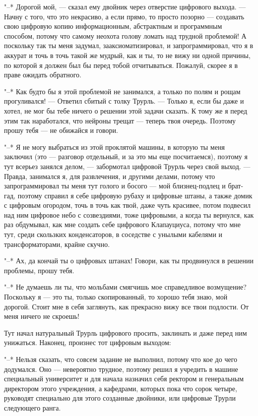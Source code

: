 "--* Дорогой мой, --- сказал ему двойник через отверстие
цифрового выхода. --- Начну с того, что это некрасиво, а если
прямо, то просто позорно --- создавать свою цифровую копию
информационным, абстрактным и программным способом, потому
что самому неохота голову ломать над трудной проблемой! А
поскольку так ты меня задумал, зааксиоматизировал, и
запрограммировал, что я в аккурат и точь в точь такой же
мудрый, как и ты, то не вижу ни одной причины, по которой я
должен был бы перед тобой отчитываться. Пожалуй, скорее я в
праве ожидать обратного.

"--* Как будто бы я этой проблемой не занимался, а только
по полям и рощам прогуливался! --- Ответил сбитый с толку
Трурль. --- Только я, если бы даже и хотел, не мог бы тебе
ничего о решении этой задачи сказать. К тому же я перед этим
так наработался, что нейроны трещат --- теперь твоя очередь.
Поэтому прошу тебя --- не обижайся и говори.

"--* Я не могу выбраться из этой проклятой машины, в
которую ты меня заключил (это --- разговор отдельный, и за это
мы еще посчитаемся), поэтому я тут всерьез занялся делом, --- забормотал
цифровой Трурль через свой выход. --- Правда,
занимался я, для развлечения, и другими делами, потому что
запрограммировал ты меня тут голого и босого --- мой
близнец-подлец и брат-гад, поэтому справил я себе цифровую
рубаху и цифровые штаны, а также домик с цифровым огородом,
точь в точь как твой, даже чуть красивее, потом подвесил над
ним цифровое небо с созвездиями, тоже цифровыми, а когда ты
вернулся, как раз обдумывал, как мне создать себе цифрового
Клапауциуса, потому что мне тут, среди скользких
конденсаторов, в соседстве с унылыми кабелями и
трансформаторами, крайне скучно.

"--* Ах, да кончай ты о цифровых штанах! Говори, как ты
продвинулся в решении проблемы, прошу тебя.

"--* Не думаешь ли ты, что мольбами смягчишь мое
справедливое возмущение? Поскольку я --- это ты, только
скопированный, то хорошо тебя знаю, мой дорогой. Стоит мне в
себя заглянуть, как прекрасно вижу все твои подлости. От
меня ничего не скроешь!

Тут начал натуральный Трурль цифрового просить, заклинать
и даже перед ним унижаться. Наконец, произнес тот цифровым
выходом:

"--* Нельзя сказать, что совсем задание не выполнил, потому
что кое до чего додумался. Оно --- невероятно трудное, поэтому
решил я учредить в машине специальный университет и для
начала назначил себя ректором и генеральным директором этого
учреждения, а кафедрами, которых пока что сорок четыре,
руководят специально для этого созданные двойники, или
цифровые Трурли следующего ранга.


